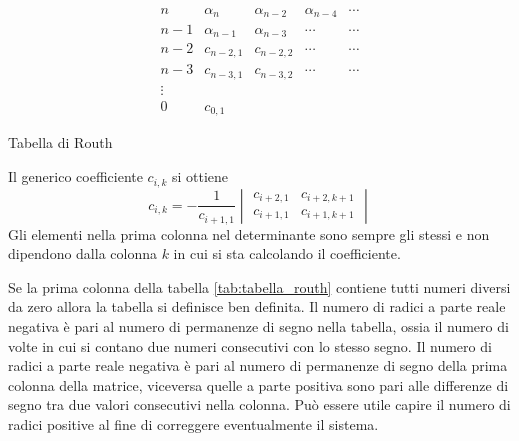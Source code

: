 \begin{table}[h]
$$
\begin{array}{c|ccccc}
 n & \alpha_n & \alpha_{n-2} & \alpha_{n-4} & \cdots \\
 n-1 & \alpha_{n-1} & \alpha_{n-3} & \cdots & \cdots \\ \hline
 n-2 & c_{n-2,1} & c_{n-2,2} & \cdots & \cdots \\
 n-3 & c_{n-3,1} & c_{n-3,2} & \cdots & \cdots\\
 \vdots \\
 0 & c_{0,1}
\end{array}
$$
\caption{Tabella di Routh}
\label{tab:tabella_routh}
\end{table}
Il generico coefficiente $c_{i,k}$ si ottiene
$$
c_{i,k} = -\frac{1}{c_{i+1,1}}\begin{vmatrix}
c_{i+2,1} & c_{i+2,k+1} \\
c_{i+1,1} & c_{i+1,k+1}
\end{vmatrix}
$$
Gli elementi nella prima colonna nel determinante sono sempre gli stessi e non
dipendono dalla colonna $k$ in cui si sta calcolando il coefficiente.

Se la prima colonna della tabella \ref{tab:tabella_routh} contiene tutti numeri
diversi da zero allora la tabella si definisce ben definita.
Il numero di radici a parte reale negativa è pari al numero di permanenze di
segno nella tabella, ossia il numero di volte in cui si contano due numeri
consecutivi con lo stesso segno.
Il numero di radici a parte reale negativa è pari al numero di permanenze di
segno della prima colonna della matrice, viceversa quelle a parte positiva sono
pari alle differenze di segno tra due valori consecutivi nella colonna.
Può essere utile capire il numero di radici positive al fine di correggere
eventualmente il sistema.

\newpage
